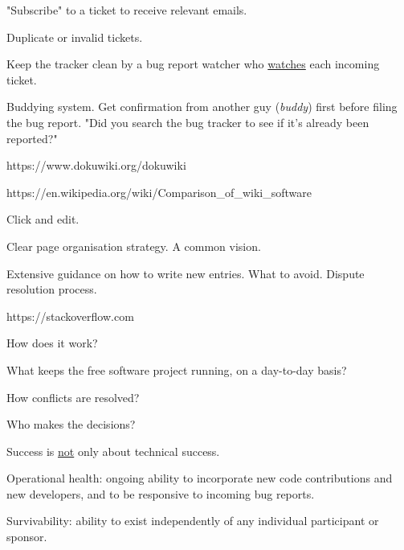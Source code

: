 \documentclass[landscape,30pt]{foils}
\begin{document}
"Subscribe" to a ticket to receive relevant emails.


Duplicate or invalid tickets.

Keep the tracker clean by a bug report watcher who \underline{watches} each incoming ticket.

Buddying system.  Get confirmation from another guy ({\em buddy}) first before filing the bug report.  "Did
you search the bug tracker to see if it's already been reported?"




https://www.dokuwiki.org/dokuwiki

https://en.wikipedia.org/wiki/Comparison\_of\_wiki\_software

Click and edit.

Clear page organisation strategy.  A common vision.

Extensive guidance on how to write new entries.  What to avoid.  Dispute resolution process.


https://stackoverflow.com






How does it work?

What keeps the free software project running, on a day-to-day basis?

How conflicts are resolved?

Who makes the decisions?

Success is \underline{not} only about technical success.

Operational health: ongoing ability to incorporate new code contributions and new developers, and to be responsive to incoming bug reports.

Survivability: ability to exist independently of any individual participant or sponsor.
\end{document}
